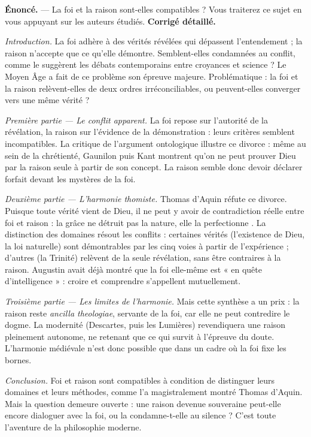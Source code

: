 \documentclass[11pt]{article}
\begin{document}
\begin{exoresolu}
\textbf{Énoncé.} — La foi et la raison sont-elles compatibles ? Vous traiterez ce sujet en vous appuyant sur les auteurs étudiés.
\tcblower
\textbf{Corrigé détaillé.}

\emph{Introduction.} La foi adhère à des vérités révélées qui dépassent l'entendement ; la raison n'accepte que ce qu'elle démontre. Semblent-elles condamnées au conflit, comme le suggèrent les débats contemporains entre croyances et science ? Le Moyen Âge a fait de ce problème son épreuve majeure. Problématique : la foi et la raison relèvent-elles de deux ordres irréconciliables, ou peuvent-elles converger vers une même vérité ?

\emph{Première partie — Le conflit apparent.} La foi repose sur l'autorité de la révélation, la raison sur l'évidence de la démonstration : leurs critères semblent incompatibles. La critique de l'argument ontologique illustre ce divorce : même au sein de la chrétienté, Gaunilon puis Kant montrent qu'on ne peut prouver Dieu par la raison seule à partir de son concept. La raison semble donc devoir déclarer forfait devant les mystères de la foi.

\emph{Deuxième partie — L'harmonie thomiste.} Thomas d'Aquin réfute ce divorce. Puisque toute vérité vient de Dieu, il ne peut y avoir de contradiction réelle entre foi et raison : \guillemotleft la grâce ne détruit pas la nature, elle la perfectionne \guillemotright. La distinction des domaines résout les conflits : certaines vérités (l'existence de Dieu, la loi naturelle) sont démontrables par les cinq voies à partir de l'expérience ; d'autres (la Trinité) relèvent de la seule révélation, sans être contraires à la raison. Augustin avait déjà montré que la foi elle-même est « en quête d'intelligence » : croire et comprendre s'appellent mutuellement.

\emph{Troisième partie — Les limites de l'harmonie.} Mais cette synthèse a un prix : la raison reste \emph{ancilla theologiae}, servante de la foi, car elle ne peut contredire le dogme. La modernité (Descartes, puis les Lumières) revendiquera une raison pleinement autonome, ne retenant que ce qui survit à l'épreuve du doute. L'harmonie médiévale n'est donc possible que dans un cadre où la foi fixe les bornes.

\emph{Conclusion.} Foi et raison sont compatibles à condition de distinguer leurs domaines et leurs méthodes, comme l'a magistralement montré Thomas d'Aquin. Mais la question demeure ouverte : une raison devenue souveraine peut-elle encore dialoguer avec la foi, ou la condamne-t-elle au silence ? C'est toute l'aventure de la philosophie moderne.
\end{exoresolu}
\end{document}
